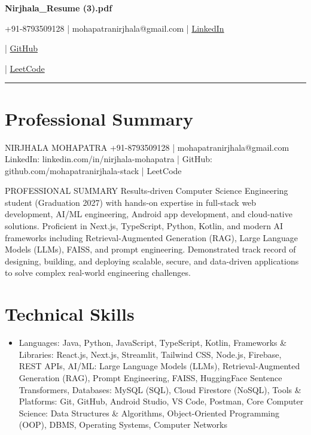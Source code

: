 \documentclass[10pt]{article}
\begin{document}
\begin{center}

{\Huge\textbf{Nirjhala\_Resume (3).pdf}}

\vspace{3pt}

+91-8793509128 
\hspace{10pt}|\hspace{10pt}
mohapatranirjhala@gmail.com
\hspace{10pt}|\hspace{10pt}
\href{}{LinkedIn}

\hspace{10pt}|\hspace{10pt}
\href{}{GitHub}

\hspace{10pt}|\hspace{10pt}
\href{}{LeetCode}

\end{center}

\vspace{6pt}

\hrule

\vspace{8pt}

\section*{Professional Summary}

NIRJHALA MOHAPATRA
+91-8793509128 | mohapatranirjhala@gmail.com
LinkedIn: linkedin.com/in/nirjhala-mohapatra | GitHub: github.com/mohapatranirjhala-stack | LeetCode

PROFESSIONAL SUMMARY
Results-driven Computer Science Engineering student (Graduation 2027) with hands-on expertise in full-stack web development, AI/ML engineering, Android app development, and cloud-native solutions. Proficient in Next.js, TypeScript, Python, Kotlin, and modern AI frameworks including Retrieval-Augmented Generation (RAG), Large Language Models (LLMs), FAISS, and prompt engineering. Demonstrated track record of designing, building, and deploying scalable, secure, and data-driven applications to solve complex real-world engineering challenges.

\section*{Technical Skills}

\begin{itemize}[leftmargin=*]

\item Languages: Java, Python, JavaScript, TypeScript, Kotlin, Frameworks \& Libraries: React.js, Next.js, Streamlit, Tailwind CSS, Node.js, Firebase, REST APIs, AI/ML: Large Language Models (LLMs), Retrieval-Augmented Generation (RAG), Prompt Engineering, FAISS, HuggingFace Sentence Transformers, Databases: MySQL (SQL), Cloud Firestore (NoSQL), Tools \& Platforms: Git, GitHub, Android Studio, VS Code, Postman, Core Computer Science: Data Structures \& Algorithms, Object-Oriented Programming (OOP), DBMS, Operating Systems, Computer Networks

\end{itemize}
\end{document}
